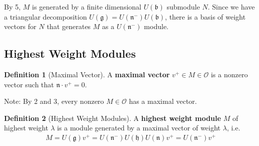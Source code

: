\documentclass[11pt]{scrartcl}
\theoremstyle{definition}
\theoremstyle{theorem}
\theoremstyle{proof}
\newenvironment{proof}
{\pushQED{$\qed$}\pf}
{\par\popQED\endpf}
\theoremstyle{definition}
\newtheorem{definition}{Definition}[theorem]
\theoremstyle{break}
\theoremstyle{problem}
\newcommand{\lieg}[0]{{\mathfrak{g}}}
\newcommand{\lieh}[0]{{\mathfrak{h}}}
\newcommand{\lien}[0]{{\mathfrak{n}}}
\renewcommand{\qed}[0]{\hfill\blacksquare}
\begin{document}
\begin{proof}[of (f)]

By 5, \(M\) is generated by a finite dimensional \(U(\mathfrak b)\)
submodule \(N\). Since we have a triangular decomposition
\(U(\lieg) = U(\lien^-) U(\mathfrak b)\), there is a basis of weight
vectors for \(N\) that generates \(M\) as a \(U(\lien^-)\)
module.\end{proof}

\hypertarget{highest-weight-modules}{%
\subsection{Highest Weight Modules}\label{highest-weight-modules}}

\begin{definition}[Maximal Vector]

A \textbf{maximal vector} \(v^+ \in M \in \mathcal O\) is a nonzero
vector such that \(\lien \cdot v^+ = 0\).\end{definition}

Note: By 2 and 3, every nonzero \(M\in \mathcal O\) has a maximal
vector.

\begin{definition}[Highest Weight Modules]

A \textbf{highest weight module} \(M\) of highest weight \(\lambda\) is
a module generated by a maximal vector of weight \(\lambda\), i.e.~
\begin{align*}M = U(\lieg) v^+ = U(\lien^-) U(\lieh) U(\lien) v^+ = U(\lien^-) v^+\end{align*}\end{definition}
\end{document}
